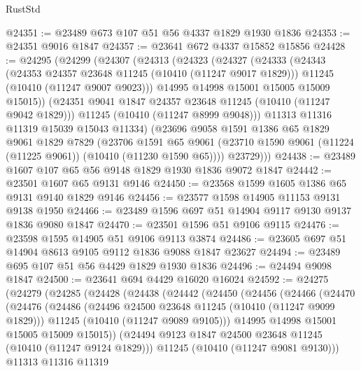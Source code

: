 \begin{lexlean}{RustStd}
\begin{coremodule}
@24351 := @23489 @673 @107 @51 @56 @4337 @1829 @1930 @1836
@24353 := @24351 @9016 @1847
@24357 := @23641 @672 @4337 @15852 @15856
@24428 := @24295
    (@24299
      (@24307
        (@24313
          (@24323
            (@24327
              (@24333
                (@24343
                  (@24353 @24357 @23648 @11245 (@10410 (@11247 @9017 @1829)))
                  @11245
                  (@10410 (@11247 @9007 @9023)))
                @14995
                @14998
                @15001
                @15005
                @15009
                @15015))
            (@24351 @9041 @1847 @24357 @23648 @11245 (@10410 (@11247 @9042 @1829)))
            @11245
            (@10410 (@11247 @8999 @9048)))
          @11313
          @11316
          @11319
          @15039
          @15043
          @11334)
        (@23696
          @9058
          @1591
          @1386
          @65
          @1829
          @9061
          @1829
          @7829
          (@23706
            @1591
            @65
            @9061
            (@23710 @1590 @9061 (@11224 (@11225 @9061)) (@10410 (@11230 @1590 @65))))
          @23729)))
@24438 := @23489 @1607 @107 @65 @56 @9148 @1829 @1930 @1836 @9072 @1847
@24442 := @23501 @1607 @65 @9131 @9146
@24450 := @23568 @1599 @1605 @1386 @65 @9131 @9140 @1829 @9146
@24456 := @23577 @1598 @14905 @11153 @9131 @9138 @1950
@24466 := @23489 @1596 @697 @51 @14904 @9117 @9130 @9137 @1836 @9080 @1847
@24470 := @23501 @1596 @51 @9106 @9115
@24476 := @23598 @1595 @14905 @51 @9106 @9113 @3874
@24486 := @23605 @697 @51 @14904 @8613 @9105 @9112 @1836 @9088 @1847 @23627
@24494 := @23489 @695 @107 @51 @56 @4429 @1829 @1930 @1836
@24496 := @24494 @9098 @1847
@24500 := @23641 @694 @4429 @16020 @16024
@24592 := @24275
    (@24279
      (@24285
        (@24428
          (@24438
            (@24442
              (@24450
                (@24456
                  (@24466
                    (@24470
                      (@24476
                        (@24486
                          (@24496 @24500 @23648 @11245 (@10410 (@11247 @9099 @1829)))
                          @11245
                          (@10410 (@11247 @9089 @9105)))
                        @14995
                        @14998
                        @15001
                        @15005
                        @15009
                        @15015))
                    (@24494 @9123 @1847 @24500 @23648 @11245 (@10410 (@11247 @9124 @1829)))
                    @11245
                    (@10410 (@11247 @9081 @9130)))
                  @11313
                  @11316
                  @11319

\end{coremodule}
\end{lexlean}
